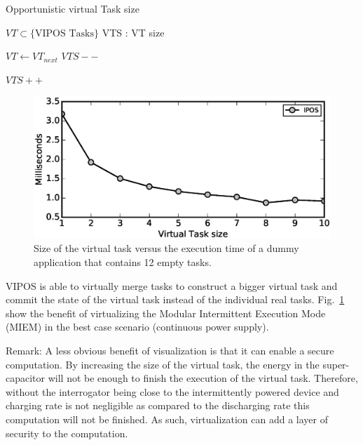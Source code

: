 \documentclass[sigconf,anonymous,review]{acmart}
\begin{document}
	\begin{algorithm}[t]
		\caption{Opportunistic virtual Task size}
		\label{algo:fixVirtTask}
		\scriptsize
		\begin{algorithmic}[1]
			\State $VT \subset \text{\{VIPOS Tasks\}} $  
			\State VTS : VT size
			\vspace{0.1cm}

				\State $VT \leftarrow VT_{next}$
				\vspace{0.1cm}
							\State $VTS--$  
						\EndIf
				\EndWhile

				\vspace{0.1cm}
					\State $VTS++$
				\EndIf
			\EndWhile
		\end{algorithmic}
	\end{algorithm}

\begin{figure}[t]
	\centering
	\includegraphics[width=0.8\columnwidth]{figures/virtualTaskSize.eps}
	\caption{Size of the virtual task versus the execution time of a dummy application that contains 12 empty tasks.}
	\label{fig:virtualTaskSize}
\end{figure}

VIPOS is able to virtually merge tasks to construct a bigger virtual task and commit the state of the virtual task instead of the individual real tasks. 
Fig.~\ref{fig:virtualTaskSize} show the benefit of virtualizing the Modular Intermittent Execution Mode (MIEM) in the best case scenario (continuous power supply). 

Remark: A less obvious benefit of visualization is that it can enable a secure computation. By increasing the size of the virtual task, the energy in the super-capacitor will not be enough to finish the execution of the virtual task. Therefore, without the interrogator being close to the intermittently powered device and charging rate is not negligible as compared to the discharging rate this computation will not be finished. As such, virtualization can add a layer of security to the computation.
\end{document}
